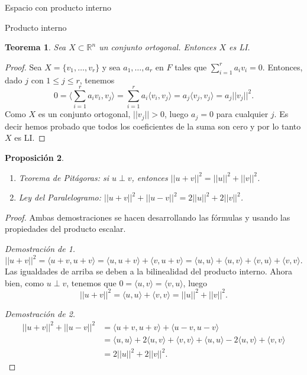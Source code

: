 \documentclass[a4paper,12pt,twoside,spanish,reqno]{amsbook}
\newtheorem{teorema}{Teorema}[section]
\newtheorem{proposicion}[teorema]{Proposici\'on}
\theoremstyle{definition}
\theoremstyle{remark}
\newcommand{\la}{\langle}
\newcommand{\ra}{\rangle}
\newcommand{\R}{\mathbb R}
\begin{document}
\begin{chapter}{Espacio con producto interno}
\begin{section}{Producto interno}
        \begin{teorema}\label{th-ortogonal-implica-li} Sea $X \subset \R^n$ un conjunto  ortogonal. Entonces $X$ es LI. 
        \end{teorema}
        \begin{proof} Sea $X =\{v_1,\ldots,v_r \}$ y sea $a_1,\ldots,a_r$ en $F$ tales que  $\sum_{i=1}^r a_iv_i =0$. Entonces,  dado $j$ con $1 \le j \le r$,  tenemos 
            $$
            0=\la\sum_{i=1}^r a_iv_i ,v_j \ra = \sum_{i=1}^r a_i\la v_i ,v_j \ra = a_j\la v_j ,v_j \ra = a_j||v_j||^2.
            $$
            Como $X$  es un conjunto ortogonal,  $||v_j|| >0$, luego $a_j =0$ para cualquier $j$. Es decir hemos probado que todos los coeficientes de la suma son cero y por lo tanto $X$  es LI.
        \end{proof}
        
        
        
        \begin{proposicion}
            ${}^{}$
            \begin{enumerate}
                \item Teorema de Pitágoras: si $u\perp v$, entonces $||u+v||^2 = ||u||^2 + ||v||^2$.
                \item Ley del Paralelogramo: $||u+v||^2+ ||u-v||^2 = 2||u||^2 + 2||v||^2$.
            \end{enumerate}
        \end{proposicion}
        \begin{proof} Ambas demostraciones se hacen desarrollando las fórmulas y usando las propiedades del producto escalar.
            
            \textit{Demostración de 1.}
            \begin{equation*}
            ||u+v||^2 = \la u+v, u+v\ra = \la u, u+v\ra+\la v, u+v\ra = \la u, u\ra+\la u, v\ra+\la v, u\ra+\la v, v\ra.
            \end{equation*} 
            Las igualdades de arriba se deben a la bilinealidad del producto interno. 
            Ahora bien,  como $u\perp v$,  tenemos que $0 = \la u, v\ra=\la v, u\ra$, luego
            \begin{equation*}
            ||u+v||^2 = \la u, u\ra+ \la v, v\ra =  ||u||^2 + ||v||^2.
            \end{equation*} 
            
            \textit{Demostración de 2.}
            \begin{align*}
            ||u+v||^2+ ||u-v||^2 &= \la u+v, u+v\ra + \la u-v, u-v\ra \\
            &= \la u, u\ra+2\la u, v\ra+\la v, v\ra + \la u, u\ra-2\la u, v\ra+\la v, v\ra \\
            &=  2||u||^2 + 2||v||^2.
            \end{align*}
        \end{proof}
        

\end{section}
\end{chapter}
\end{document}
